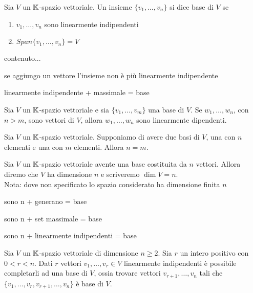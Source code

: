 \begin{definition}[base]
	Sia $ V $ un $ \mathbb{K} $-spazio vettoriale. Un insieme $ \{v_1, \ldots, v_n\} $ si dice base di $ V $ se
	\begin{enumerate}[label=(\roman*)]
		\item $ v_1, \ldots, v_n $ sono linearmente indipendenti
		\item $ Span\{v_1, \ldots , v_n\} = V $
	\end{enumerate}
\end{definition}

\begin{thm}
	contenuto...
\end{thm}

\begin{definition}
	\textsf{se aggiungo un vettore l'insieme non è più linearmente indipendente}	
\end{definition}

\begin{thm}
	\textsf{linearmente indipendente + massimale = base}
\end{thm}

\begin{thm}
	Sia $ V $ un $ \mathbb{K} $-spazio vettoriale e sia $ \{v_1, \ldots, v_m\} $ una base di $ V $. Se $ w_1, \ldots, w_n $, con $ n > m $, sono vettori di $ V $, allora $ w_1, \ldots, w_n $ sono linearmente dipendenti.
\end{thm}

\begin{corollary}
	Sia $ V $ un $ \mathbb{K} $-spazio vettoriale. Supponiamo di avere due basi di $ V $, una con $ n $ elementi e una con $ m $ elementi. Allora $ n = m $.
\end{corollary}

\begin{definition}[dimensione]
	Sia $ V $ un $ \mathbb{K} $-spazio vettoriale avente una base costituita da $ n $ vettori. Allora diremo che $ V $ ha dimensione $ n $ e scriveremo $ \dim{V} = n $. \\ \textsf{Nota: dove non specificato lo spazio considerato ha dimensione finita $ n $}
\end{definition}

\begin{thm}
	\textsf{sono n + generano = base}
\end{thm}

\begin{thm}
	\textsf{sono n + set massimale = base}
\end{thm}

\begin{thm}
	\textsf{sono n + linearmente indipendenti = base}
\end{thm}

\begin{thm}
	Sia $ V $ un $ \mathbb{K} $-spazio vettoriale di dimensione $ n \geq 2 $. Sia $ r $ un intero positivo con $ 0 < r < n $. Dati $ r $ vettori $ v_1, \ldots , v_r \in V $ linearmente indipendenti è possibile completarli ad una base di $ V $, ossia trovare vettori $ v_{r+1}, \ldots, v_n $ tali che $ \{v_1, \ldots , v_r, v_{r+1}, \ldots , v_n\} $ è base di $ V $.
\end{thm}